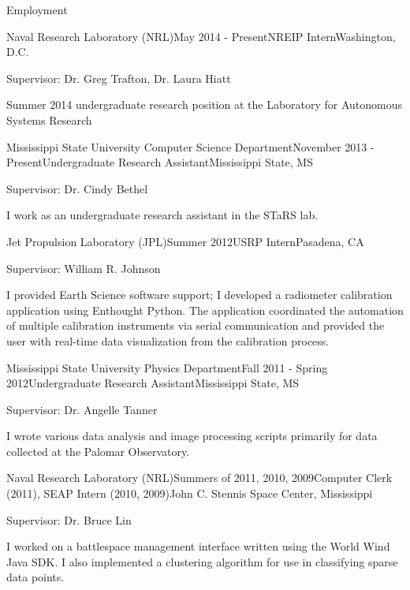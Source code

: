\documentclass{resume} %
\begin{document}
\begin{rSection}{Employment}

	\begin{rSubsection}{Naval Research Laboratory (NRL)}{May 2014 - Present}{NREIP Intern}{Washington, D.C.}
	\item Supervisor: Dr. Greg Trafton, Dr. Laura Hiatt
	\item Summer 2014 undergraduate research position at the Laboratory for Autonomous Systems Research
	\end{rSubsection}

	\begin{rSubsection}{Mississippi State University Computer Science Department}{November 2013 - Present}{Undergraduate Research Assistant}{Mississippi State, MS}
	\item Supervisor: Dr. Cindy Bethel
	\item I work as an undergraduate research assistant in the STaRS lab.
	\end{rSubsection}
	
	\begin{rSubsection}{Jet Propulsion Laboratory (JPL)}{Summer 2012}{USRP Intern}{Pasadena, CA}
	\item Supervisor: William R. Johnson
	\item I provided Earth Science software support; I developed a radiometer calibration application using Enthought Python.  The application coordinated the automation of multiple calibration instruments via serial communication and provided the user with real-time data visualization from the calibration process.
	\end{rSubsection}
	
	\begin{rSubsection}{Mississippi State University Physics Department}{Fall 2011 - Spring 2012}{Undergraduate Research Assistant}{Mississippi State, MS}
	\item Supervisor: Dr. Angelle Tanner
	\item I wrote various data analysis and image processing scripts primarily for data collected at the Palomar Observatory.
	\end{rSubsection}
	
	\begin{rSubsection}{Naval Research Laboratory (NRL)}{Summers of 2011, 2010, 2009}{Computer Clerk (2011), SEAP Intern (2010, 2009)}{John C. Stennis Space Center, Mississippi 
}
	\item Supervisor: Dr. Bruce Lin 
	\item I worked on a battlespace management interface written using the World Wind Java SDK.  I also implemented a clustering algorithm for use in classifying sparse data points.
	\end{rSubsection}


\end{rSection}
\end{document}
